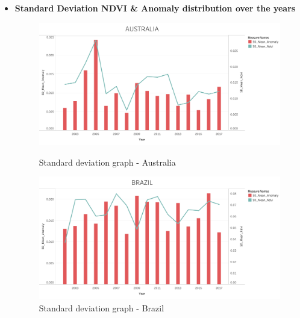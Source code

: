 \begin{itemize}
    \clearpage
    \newpage

    \item \textbf{Standard Deviation NDVI \& Anomaly distribution over the years}

    \begin{figure}[!htb]
        \begin{minipage}{0.5\textwidth}
            \centering
            \includegraphics[width=1.0\linewidth]{figures/ch5/StandardDeviation/AUSTRALIA_SD.png}
            \caption{Standard deviation graph - Australia}\label{Fig:AUSTRALIA_SD}
        \end{minipage}\hfill
        \begin{minipage}{0.5\textwidth}
            \centering
            \includegraphics[width=1.0\linewidth]{figures/ch5/StandardDeviation/BRAZIL_SD.png}
            \caption{Standard deviation graph - Brazil}\label{Fig:BRAZIL_SD}
        \end{minipage}
    \end{figure}
    

\end{itemize}
